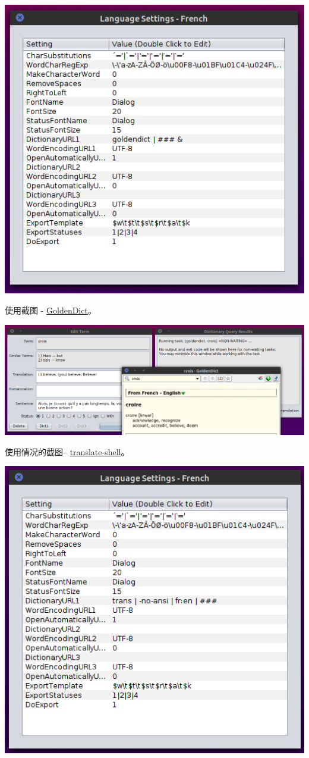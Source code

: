 \documentclass[cn,10pt,math=newtx,citestyle=gb7714-2015,bibstyle=gb7714-2015]{elegantbook}
\newcommand{\goldendict}{\href{http://goldendict.org/}{GoldenDict}}
\newcommand{\translateshell}{\href{https://github.com/soimort/translate-shell}{translate-shell}}
\begin{document}
\includegraphics[scale=0.5]{image/images-030.png}

使用截图 - \goldendict 。

\includegraphics[scale=0.4]{image/images-031.png}


使用情况的截图-- \translateshell。

\includegraphics[scale=0.6]{image/images-032.png}
\end{document}
